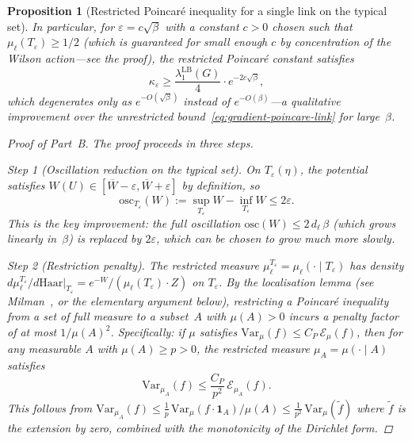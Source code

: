 \documentclass[12pt,a4paper]{article}
\theoremstyle{definition}
\theoremstyle{plain}
\newtheorem{proposition}[definition]{Proposition}
\theoremstyle{remark}
\begin{document}
\begin{proposition}[Restricted Poincar\'e inequality for a single link on the typical set]
In particular, for $\varepsilon = c\sqrt{\beta}$ with a constant $c > 0$ chosen such that $\mu_\ell(T_\varepsilon) \geq 1/2$ (which is guaranteed for small enough $c$ by concentration of the Wilson action---see the proof), the restricted Poincar\'e constant satisfies
\begin{equation}\label{eq:restricted-constant-explicit}
    \kappa_\varepsilon \geq \frac{\lambda_1^{\mathrm{LB}}(G)}{4}\cdot e^{-2c\sqrt{\beta}},
\end{equation}
which degenerates only as $e^{-O(\sqrt{\beta})}$ instead of $e^{-O(\beta)}$---a qualitative improvement over the unrestricted bound~\eqref{eq:gradient-poincare-link} for large~$\beta$.

\begin{proof}[Proof of Part~B]
The proof proceeds in three steps.

\emph{Step 1 (Oscillation reduction on the typical set).}
On $T_\varepsilon(\eta)$, the potential satisfies $W(U) \in [\overline{W} - \varepsilon, \overline{W} + \varepsilon]$ by definition, so
\[
    \mathrm{osc}_{T_\varepsilon}(W) := \sup_{T_\varepsilon} W - \inf_{T_\varepsilon} W \leq 2\varepsilon.
\]
This is the key improvement: the full oscillation $\mathrm{osc}(W) \leq 2\,d_\ell\,\beta$ (which grows linearly in~$\beta$) is replaced by $2\varepsilon$, which can be chosen to grow much more slowly.

\emph{Step 2 (Restriction penalty).}
The restricted measure $\mu_\ell^{T_\varepsilon} = \mu_\ell(\cdot \mid T_\varepsilon)$ has density $d\mu_\ell^{T_\varepsilon}/d\mathrm{Haar}|_{T_\varepsilon} = e^{-W}/(\mu_\ell(T_\varepsilon) \cdot Z)$ on $T_\varepsilon$. By the localisation lemma (see Milman~\cite{Milman2009}, or the elementary argument below), restricting a Poincar\'e inequality from a set of full measure to a subset~$A$ with $\mu(A) > 0$ incurs a penalty factor of at most $1/\mu(A)^2$. Specifically: if $\mu$ satisfies $\mathrm{Var}_\mu(f) \leq C_P\,\mathcal{E}_\mu(f)$, then for any measurable $A$ with $\mu(A) \geq p > 0$, the restricted measure $\mu_A = \mu(\cdot \mid A)$ satisfies
\[
    \mathrm{Var}_{\mu_A}(f) \leq \frac{C_P}{p^2}\,\mathcal{E}_{\mu_A}(f).
\]
This follows from $\mathrm{Var}_{\mu_A}(f) \leq \frac{1}{p}\,\mathrm{Var}_\mu(f\cdot\mathbf{1}_A)/\mu(A) \leq \frac{1}{p^2}\,\mathrm{Var}_\mu(\tilde{f})$ where $\tilde{f}$ is the extension by zero, combined with the monotonicity of the Dirichlet form.


\end{proof}
\end{proposition}
\end{document}
